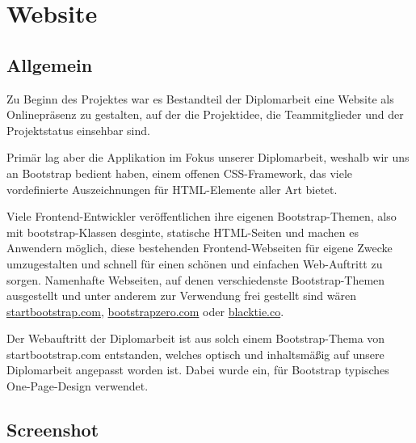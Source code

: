 \chapter{Website}
\section{Allgemein}
Zu Beginn des Projektes war es Bestandteil der Diplomarbeit eine Website als
Onlinepräsenz zu gestalten, auf der die Projektidee, die Teammitglieder und der
Projektstatus einsehbar sind.

Primär lag aber die Applikation im Fokus unserer Diplomarbeit, weshalb wir uns
an Bootstrap bedient haben, einem offenen CSS-Framework, das viele vordefinierte
Auszeichnungen für HTML-Elemente aller Art bietet.

Viele Frontend-Entwickler veröffentlichen ihre eigenen Bootstrap-Themen, also
mit bootstrap-Klassen desginte, statische HTML-Seiten und machen es Anwendern
möglich, diese bestehenden Frontend-Webseiten für eigene Zwecke umzugestalten
und schnell für einen schönen und einfachen Web-Auftritt zu sorgen. Namenhafte
Webseiten, auf denen verschiedenste Bootstrap-Themen ausgestellt und unter
anderem zur Verwendung frei gestellt sind wären \href{http://startbootstrap.com/}{startbootstrap.com},
\href{http://bootstrapzero.com/}{bootstrapzero.com} oder \href{http://blacktie.co/}{blacktie.co}.

Der Webauftritt der Diplomarbeit ist aus solch einem Bootstrap-Thema von
startbootstrap.com entstanden, welches optisch und inhaltsmäßig auf unsere
Diplomarbeit angepasst worden ist. Dabei wurde ein, für Bootstrap typisches
One-Page-Design verwendet.

\section{Screenshot}
